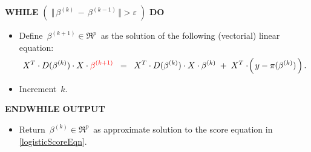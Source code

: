 \begin{proposition}
\begin{enumerate}
\begin{center}
\begin{minipage}{6in}
{	\vskip 0.2cm
	\textnormal{\bf WHILE} \; $\left(\;\Vert\,\beta^{(k)} \,-\, \beta^{(k-1)}\,\Vert > \varepsilon\;\right)$ \; \textnormal{\bf DO}
	\begin{itemize}
	\item
		Define \,$\beta^{(k+1)} \in \Re^{p}$\, as the solution of the following (vectorial) linear equation:
		\begin{equation*}
			X^{T} \cdot D(\beta^{(k)}) \cdot X \cdot {\color{red}\beta^{(k+1)}}
			\;\; = \;\;
				X^{T} \cdot D(\beta^{(k)}) \cdot X \cdot \beta^{(k)}
				\;+\; X^{T}\cdot\!\left(\,y - \pi(\beta^{(k)})\,\right).
		\end{equation*}
	\item
		Increment \,$k$.	
	\end{itemize}
	\textnormal{\bf ENDWHILE}
	\vskip 0.4cm
	\textnormal{\bf OUTPUT}
	\begin{itemize}
	\item
		Return \,$\beta^{(k)} \in \Re^{p}$\, as approximate solution to the score equation
		in \eqref{logisticScoreEqn}.
	\end{itemize}
	}
	\end{minipage}
	\end{center}
\end{enumerate}
\end{proposition}
\proof
